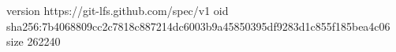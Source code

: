 version https://git-lfs.github.com/spec/v1
oid sha256:7b4068809cc2c7818c887214dc6003b9a45850395df9283d1c855f185bea4c06
size 262240
